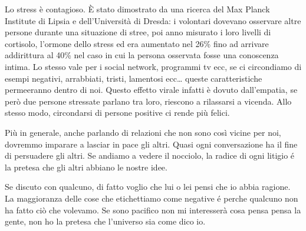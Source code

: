 \documentclass[12pt]{book} %
\begin{document}
\bigskip

Lo stress è contagioso. È stato dimostrato da una ricerca del Max Planck Institute di Lipsia e dell'Università di
Dresda: i volontari dovevano osservare altre persone durante una situazione di stree, poi anno misurato i loro livelli
di cortisolo, l'ormone dello stress ed era aumentato nel 26\% fino ad arrivare addirittura al 40\% nel caso in cui la
persona osservata fosse una conoscenza intima. Lo stesso vale per i social network, programmi tv ecc, se ci circondiamo
di esempi negativi, arrabbiati, tristi, lamentosi ecc… queste caratteristiche permeeranno dentro di noi. Questo effetto
{\textquotedbl}virale{\textquotedbl} infatti è dovuto dall'empatia, se però due persone stressate parlano tra loro,
riescono a rilassarsi a vicenda. Allo stesso modo, circondarsi di persone positive ci rende più felici. 


\bigskip

Più in generale, anche parlando di relazioni che non sono così vicine per noi, dovremmo imparare a lasciar in pace gli
altri. Quasi ogni conversazione ha il fine di persuadere gli altri. Se andiamo a vedere il nocciolo, la radice di ogni litigio é la pretesa che gli altri abbiano le nostre idee.

Se discuto con qualcuno, di fatto voglio che lui o lei pensi che io abbia ragione.
La maggioranza delle cose che etichettiamo come negative é perche qualcuno non ha fatto ciò che volevamo. Se sono pacifico non mi interesserà cosa pensa pensa la gente, non ho la pretesa che l'universo sia come dico io.
\end{document}
